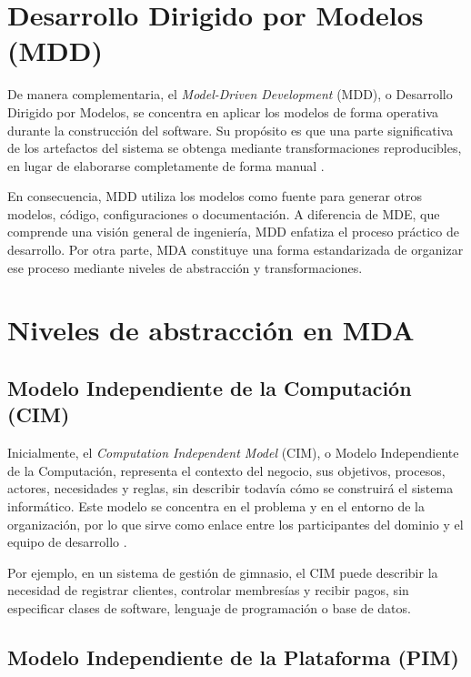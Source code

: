 \documentclass[12pt,a4paper]{article}
\begin{document}
\section{Desarrollo Dirigido por Modelos (MDD)}

De manera complementaria, el \textit{Model-Driven Development} (MDD), o Desarrollo Dirigido por Modelos, se concentra en aplicar los modelos de forma operativa durante la construcción del software. Su propósito es que una parte significativa de los artefactos del sistema se obtenga mediante transformaciones reproducibles, en lugar de elaborarse completamente de forma manual \cite{brambilla2017}.

En consecuencia, MDD utiliza los modelos como fuente para generar otros modelos, código, configuraciones o documentación. A diferencia de MDE, que comprende una visión general de ingeniería, MDD enfatiza el proceso práctico de desarrollo. Por otra parte, MDA constituye una forma estandarizada de organizar ese proceso mediante niveles de abstracción y transformaciones.

\section{Niveles de abstracción en MDA}

\subsection{Modelo Independiente de la Computación (CIM)}

Inicialmente, el \textit{Computation Independent Model} (CIM), o Modelo Independiente de la Computación, representa el contexto del negocio, sus objetivos, procesos, actores, necesidades y reglas, sin describir todavía cómo se construirá el sistema informático. Este modelo se concentra en el problema y en el entorno de la organización, por lo que sirve como enlace entre los participantes del dominio y el equipo de desarrollo \cite{omg2014mda}.

Por ejemplo, en un sistema de gestión de gimnasio, el CIM puede describir la necesidad de registrar clientes, controlar membresías y recibir pagos, sin especificar clases de software, lenguaje de programación o base de datos.

\subsection{Modelo Independiente de la Plataforma (PIM)}
\end{document}
